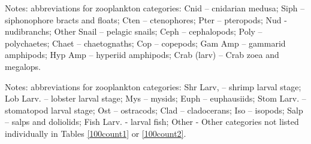 \documentclass[letterpaper,11pt]{article}
\newcommand{\cruiseID}{S275}
\begin{document}
\begin{landscape}
\clearpage

\noindent Notes: abbreviations for zooplankton categories: Cnid – cnidarian medusa; Siph – siphonophore bracts and floats; Cten – ctenophores; Pter – pteropods; Nud - nudibranchs; Other Snail – pelagic snails; Ceph – cephalopods; Poly – polychaetes; Chaet – chaetognaths; Cop – copepods; Gam Amp – gammarid amphipods; Hyp Amp – hyperiid amphipods; Crab (larv) – Crab zoea and megalops.

\clearpage

\noindent Notes: abbreviations for zooplankton categories: Shr Larv, – shrimp larval stage; Lob Larv. – lobster larval stage; Mys – mysids; Euph – euphausiids; Stom Larv. – stomatopod larval stage; Ost – ostracods; Clad – cladocerans; Iso – isopods; Salp – salps and doliolids; Fish Larv. - larval fish; Other - Other categories not listed individually in Tables \ref{100count1} or \ref{100count2}.



\end{landscape}
\end{document}
